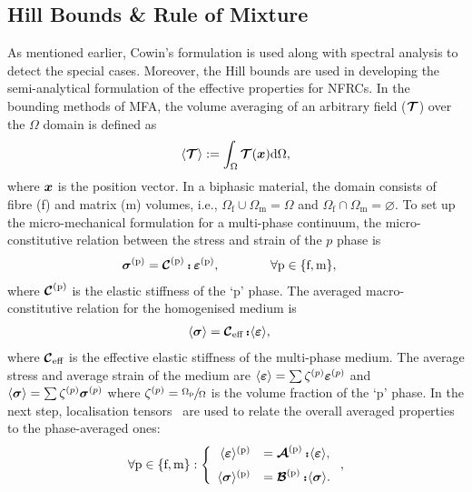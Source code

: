 \subsection{Hill Bounds \& Rule of Mixture} 
	As mentioned earlier, Cowin's formulation is used along with spectral analysis to detect the special cases. Moreover, the Hill bounds are used in developing the semi-analytical formulation of the effective properties for NFRCs. In the bounding methods of MFA, the volume averaging of an arbitrary field ($\mathord{\mbox{\boldmath$\mathcal{T}$}}$) over the $\Omega$ domain is defined as
	\begin{equation}
	\avevol{\tend{T}} \equidef \int_{\Omega}\tend{T}(\tena{x})\dif\Omega,
	\end{equation}
	where $\tena{x}$ is the position vector. In a biphasic material, the domain consists of fibre (f) and matrix (m) volumes, i.e., $\Omega_\text{f} \cup \Omega_\text{m}=\Omega$ and $\Omega_\text{f} \cap \Omega_\text{m}=\varnothing$. To set up the micro-mechanical formulation for a multi-phase continuum, the micro-constitutive relation between the stress and strain of the $p$ phase is
	\begin{alignat}{2}
	\tenb{\sigma}^\text{(p)} &= \tend{C}^\text{(p)}\dscp\tenb{\varepsilon}^\text{(p)},\qquad\qquad\forall\text{p}\in\{\text{f},\text{m}\},
	\end{alignat}
	where $ \mathord{\mbox{\boldmath$\mathcal{C}$}}^\text{(p)}$ is the elastic stiffness of the `p' phase. The averaged macro-constitutive relation for the homogenised medium is
	\begin{alignat}{2}
		\avevol{\tenb{\sigma}} &= \tend{C}_\text{eff}\dscp\avevol{\tenb{\varepsilon}},
	\end{alignat}
	where $\mathord{\mbox{\boldmath$\mathcal{C}$}}_\text{eff}$ is the effective elastic stiffness of the multi-phase medium. The average stress and average strain of the medium are $\avevol{\tenb{\varepsilon}}=\sum\zeta^{(p)}\tenb{\varepsilon}^{(p)}$ and $\avevol{\tenb{\sigma}}	=\sum\zeta^{(p)}\tenb{\sigma}^{(p)}$ where $\zeta^{(p)}=\sfrac{\Omega_\text{p}}{\Omega}$ is the volume fraction of the `p' phase. In the next step, localisation tensors~\autocite{Hill.1963} are used to relate the overall averaged properties to the phase-averaged ones:
	\begin{alignat}{2}
	\forall\text{p}\in\{\text{f},\text{m}\}:\left\{
	\begin{array}{rl}
		\avevol{\tenb{\varepsilon}}^\text{(p)} &= \tend{A}^\text{(p)}\dscp\avevol{\tenb{\varepsilon}},\\[0.2cm]
		\avevol{\tenb{\sigma}}^\text{(p)} 	&= \tend{B}^\text{(p)}\dscp\avevol{\tenb{\sigma}}.
	\end{array}\right.,
	\end{alignat}
